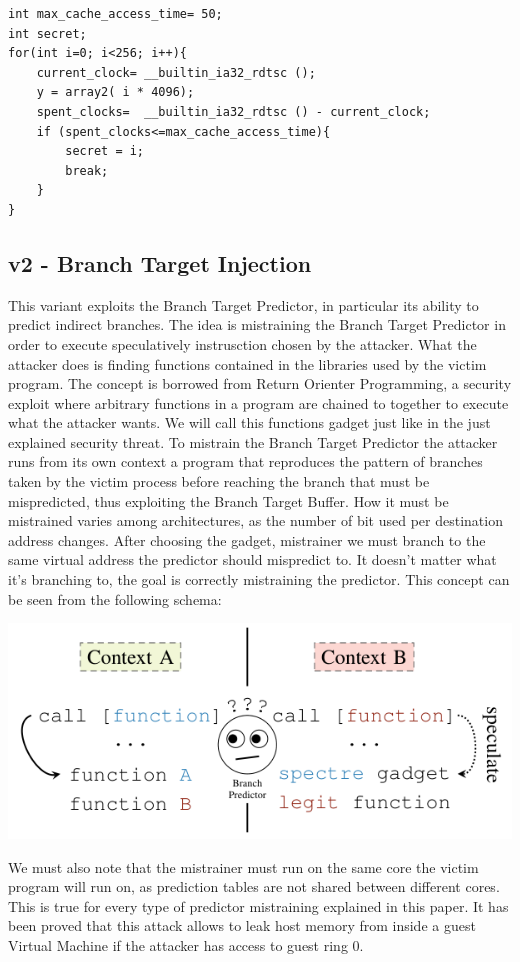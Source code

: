 \begin{verbatim}
int max_cache_access_time= 50;
int secret;
for(int i=0; i<256; i++){
	current_clock= __builtin_ia32_rdtsc ();
	y = array2( i * 4096);
	spent_clocks=  __builtin_ia32_rdtsc () - current_clock;
	if (spent_clocks<=max_cache_access_time){
		secret = i;
		break;
	}
}
\end{verbatim}

\subsection{v2 - Branch Target Injection}
This variant exploits the Branch Target Predictor, in particular its ability to predict indirect branches.
The idea is mistraining the Branch Target Predictor in order to execute speculatively instrusction chosen by the attacker.
What the attacker does is finding functions contained in the libraries used by the victim program.
The concept is borrowed from Return Orienter Programming, a security exploit where arbitrary functions in a program are chained to together to execute what the attacker wants.
We will call this functions gadget just like in the just explained security threat.
To mistrain the Branch Target Predictor the attacker runs from its own context a program that reproduces the pattern of branches taken by the victim process before reaching the branch that must be mispredicted, thus exploiting the Branch Target Buffer.
How it must be mistrained varies among architectures, as the number of bit used per destination address changes.
After choosing the gadget, mistrainer we must branch to the same virtual address the predictor should mispredict to.
It doesn't matter what it's branching to, the goal is correctly mistraining the predictor.
This concept can be seen from the following schema:

\includegraphics[scale=0.4]{img/sv2-mistraining.png}

We must also note that the mistrainer must run on the same core the victim program will run on, as prediction tables are not shared between different cores.
This is true for every type of predictor mistraining explained in this paper.
It has been proved that this attack allows to leak host memory from inside a guest Virtual Machine if the attacker has access to guest ring 0.

